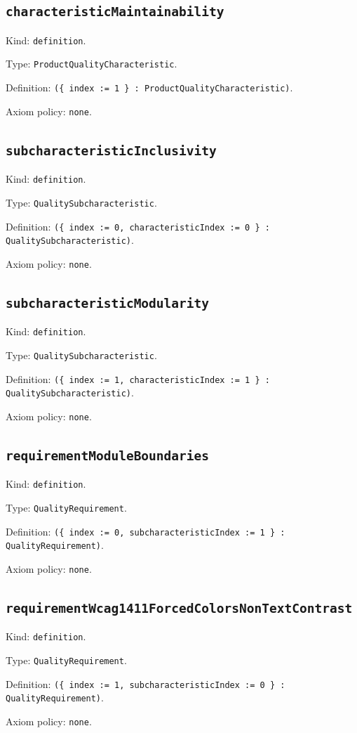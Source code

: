 \documentclass[11pt]{article}
\begin{document}
\subsection*{\texttt{characteristicMaintainability}}
\noindent Kind: \texttt{definition}.\par
\noindent Type: \texttt{ProductQualityCharacteristic}.\par
\noindent Definition: \texttt{(\{ index := 1 \} : ProductQualityCharacteristic)}.\par
\noindent Axiom policy: \texttt{none}.\par
\subsection*{\texttt{subcharacteristicInclusivity}}
\noindent Kind: \texttt{definition}.\par
\noindent Type: \texttt{QualitySubcharacteristic}.\par
\noindent Definition: \texttt{(\{ index := 0, characteristicIndex := 0 \} : QualitySubcharacteristic)}.\par
\noindent Axiom policy: \texttt{none}.\par
\subsection*{\texttt{subcharacteristicModularity}}
\noindent Kind: \texttt{definition}.\par
\noindent Type: \texttt{QualitySubcharacteristic}.\par
\noindent Definition: \texttt{(\{ index := 1, characteristicIndex := 1 \} : QualitySubcharacteristic)}.\par
\noindent Axiom policy: \texttt{none}.\par
\subsection*{\texttt{requirementModuleBoundaries}}
\noindent Kind: \texttt{definition}.\par
\noindent Type: \texttt{QualityRequirement}.\par
\noindent Definition: \texttt{(\{ index := 0, subcharacteristicIndex := 1 \} : QualityRequirement)}.\par
\noindent Axiom policy: \texttt{none}.\par
\subsection*{\texttt{requirementWcag1411ForcedColorsNonTextContrast}}
\noindent Kind: \texttt{definition}.\par
\noindent Type: \texttt{QualityRequirement}.\par
\noindent Definition: \texttt{(\{ index := 1, subcharacteristicIndex := 0 \} : QualityRequirement)}.\par
\noindent Axiom policy: \texttt{none}.\par
\end{document}
